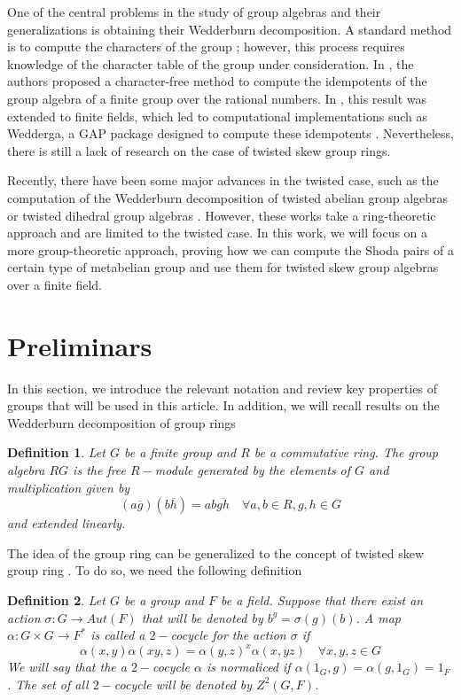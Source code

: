 \documentclass{article}
\newtheorem{definition}{Definition}
\begin{document}
One of the central problems in the study of group algebras and their generalizations is obtaining their Wedderburn decomposition. A standard method is to compute the characters of the group \cite{Yamada1974}; however, this process requires knowledge of the character table of the group under consideration. In \cite{JespersLealPaques2003}, the authors proposed a character-free method to compute the idempotents of the group algebra of a finite group over the rational numbers. In \cite{BROCHE200771}, this result was extended to finite fields, which led to computational implementations such as Wedderga, a GAP package designed to compute these idempotents \cite{Wedderga}. Nevertheless, there is still a lack of research on the case of twisted skew group rings.

Recently, there have been some major advances in the twisted case, such as the computation of the Wedderburn decomposition of twisted abelian group algebras \cite{DUARTE2024102386} or twisted dihedral group algebras \cite{DUARTE2026102792}. However, these works take a ring-theoretic approach and are limited to the twisted case. In this work, we will focus on a more group-theoretic approach, proving how we can compute the Shoda pairs of a certain type of metabelian group and use them for twisted skew group algebras over a finite field.

\section{Preliminars}
In this section, we introduce the relevant notation and review key properties of groups that will be used in this article. In addition, we will recall results on the Wedderburn decomposition of group rings
\begin{definition}
    Let $G$ be a finite group and $R$ be a commutative ring. The group algebra $RG$ is the free $R-$module generated by the elements of $G$ and multiplication given by
    \begin{equation}
        (a \overline{g})(b \overline{h}) = ab \overline{gh} \quad \forall a,b \in R, g,h \in G
    \end{equation}
    and extended linearly. 
\end{definition}

The idea of the group ring can be generalized to the concept of twisted skew group ring \cite{Karpilovsky1989}. To do so, we need the following definition

\begin{definition}
    Let $G$ be a group and $F$ be a field. Suppose that there exist an action $\sigma:G \longrightarrow Aut(F)$ that will be denoted by $b^g = \sigma(g)(b)$. A map $\alpha:G\times G \longrightarrow F^*$ is called a $2-$cocycle for the action $\sigma$ if 
    \begin{equation}
        \alpha(x,y)\alpha(xy,z)= \alpha(y,z)^x\alpha(x,yz) \quad \forall x,y,z\in G
    \end{equation}
    We will say that the a $2-$cocycle $\alpha$ is normaliced if $\alpha(1_G,g) = \alpha(g,1_G) = 1_F$. The set of all $2-$cocycle will be denoted by $Z^2(G,F)$.
\end{definition}
\end{document}
